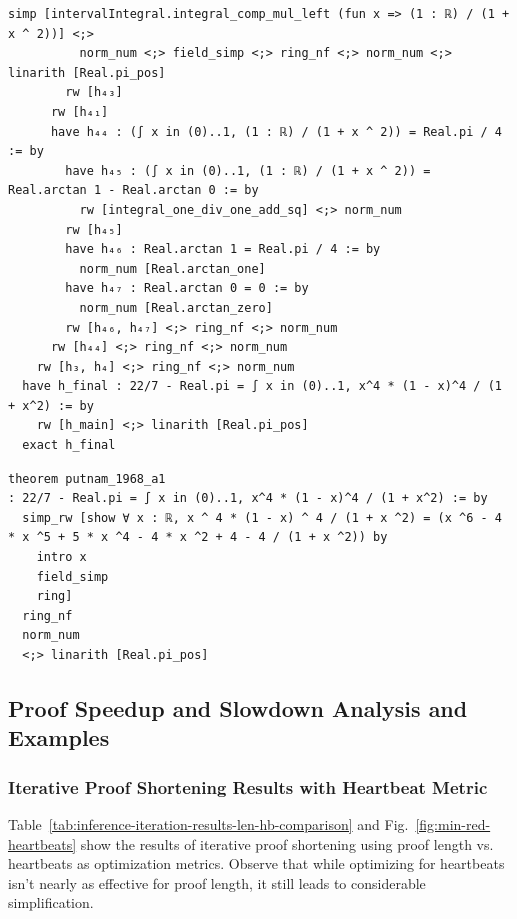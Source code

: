 \begin{tcolorbox}[colback=lightblue, boxrule=0pt, arc=5pt, outer arc=5pt, before skip=0pt, after skip=0pt, boxsep=0pt]
\begin{minipage}[t]{0.99\textwidth}
\begin{lstlisting}[language=lean, breaklines=true, style=mystyletiny]
          simp [intervalIntegral.integral_comp_mul_left (fun x => (1 : ℝ) / (1 + x ^ 2))] <;> 
          norm_num <;> field_simp <;> ring_nf <;> norm_num <;> linarith [Real.pi_pos]
        rw [h₄₃]
      rw [h₄₁]
      have h₄₄ : (∫ x in (0)..1, (1 : ℝ) / (1 + x ^ 2)) = Real.pi / 4 := by
        have h₄₅ : (∫ x in (0)..1, (1 : ℝ) / (1 + x ^ 2)) = Real.arctan 1 - Real.arctan 0 := by
          rw [integral_one_div_one_add_sq] <;> norm_num
        rw [h₄₅]
        have h₄₆ : Real.arctan 1 = Real.pi / 4 := by
          norm_num [Real.arctan_one]
        have h₄₇ : Real.arctan 0 = 0 := by
          norm_num [Real.arctan_zero]
        rw [h₄₆, h₄₇] <;> ring_nf <;> norm_num
      rw [h₄₄] <;> ring_nf <;> norm_num
    rw [h₃, h₄] <;> ring_nf <;> norm_num
  have h_final : 22/7 - Real.pi = ∫ x in (0)..1, x^4 * (1 - x)^4 / (1 + x^2) := by
    rw [h_main] <;> linarith [Real.pi_pos]
  exact h_final
\end{lstlisting}
\end{minipage}

\begin{minipage}[t]{0.99\textwidth}
\begin{lstlisting}[caption={Original Proof (Length 1097) and Simplified Proof (Length 76)},label={lst:examples-tail}, language=lean, breaklines=true, style=mystyle]
theorem putnam_1968_a1
: 22/7 - Real.pi = ∫ x in (0)..1, x^4 * (1 - x)^4 / (1 + x^2) := by
  simp_rw [show ∀ x : ℝ, x ^ 4 * (1 - x) ^ 4 / (1 + x ^2) = (x ^6 - 4 * x ^5 + 5 * x ^4 - 4 * x ^2 + 4 - 4 / (1 + x ^2)) by
    intro x
    field_simp
    ring]
  ring_nf
  norm_num
  <;> linarith [Real.pi_pos]
\end{lstlisting}
\end{minipage}
\end{tcolorbox}

\newpage

\subsection{Proof Speedup and Slowdown Analysis and Examples} 

\subsubsection{Iterative Proof Shortening Results with Heartbeat Metric} \label{sec:appendix-heartbeats}

Table~\ref{tab:inference-iteration-results-len-hb-comparison} and Fig.~\ref{fig:min-red-heartbeats} show the results of iterative proof shortening using proof length vs. heartbeats as optimization metrics. Observe that while optimizing for heartbeats isn't nearly as effective for proof length, it still leads to considerable simplification. 


